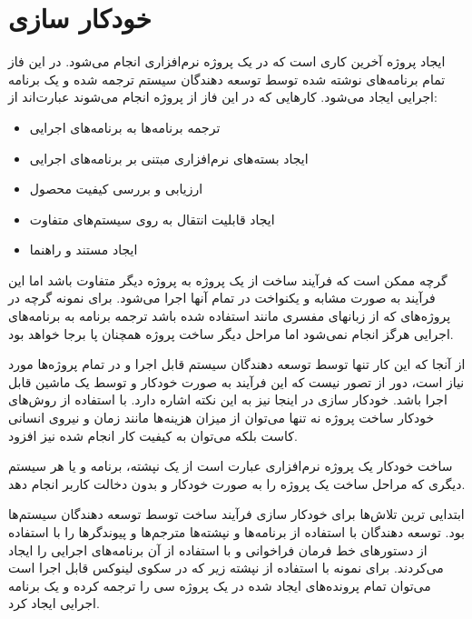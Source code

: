 

\chapter{خودکار سازی}

ایجاد پروژه آخرین کاری است که در یک پروژه نرم‌افزاری انجام می‌شود. در این  فاز
تمام برنامه‌های نوشته شده توسط توسعه دهندگان سیستم ترجمه شده و یک برنامه اجرایی
ایجاد می‌شود. کارهایی که در این فاز از پروژه انجام می‌شوند عبارت‌اند از:

\begin{itemize}
  \item ترجمه برنامه‌ها به برنامه‌های اجرایی
  \item ایجاد بسته‌های نرم‌افزاری مبتنی بر برنامه‌های اجرایی
  \item ارزیابی و بررسی کیفیت محصول
  \item ایجاد قابلیت انتقال به روی سیستم‌های متفاوت
  \item ایجاد مستند و راهنما
\end{itemize}

گرچه ممکن است که فرآیند ساخت از یک پروژه به پروژه دیگر متفاوت باشد اما این
فرآیند به صورت مشابه و یکنواخت در تمام آنها اجرا می‌شود. برای نمونه گرچه در
پروژه‌های که از زبانهای مفسری مانند  استفاده شده باشد ترجمه برنامه به
برنامه‌های اجرایی هرگز انجام نمی‌شود اما مراحل دیگر ساخت پروژه همچنان پا برجا
خواهد بود.

از آنجا که این کار تنها توسط توسعه دهندگان سیستم قابل اجرا و در تمام
پروژه‌ها مورد نیاز است، دور از تصور نیست که این فرآیند به صورت خودکار و توسط یک
ماشین قابل اجرا باشد. خودکار سازی در اینجا نیز به این نکته اشاره دارد. با
استفاده از روش‌های خودکار ساخت پروژه نه تنها می‌توان از میزان هزینه‌ها مانند
زمان و نیروی انسانی کاست بلکه می‌توان به کیفیت کار انجام شده نیز افزود.

ساخت خودکار یک پروژه نرم‌افزاری عبارت است از یک نپشته،
برنامه و یا هر سیستم دیگری که مراحل ساخت یک پروژه را به صورت خودکار و بدون دخالت
کاربر انجام دهد.
    

ابتدایی ترین تلاش‌ها برای خودکار سازی فرآیند ساخت توسط توسعه دهندگان سیستم‌ها
بود. توسعه دهندگان با استفاده از برنامه‌ها و نپشته‌ها مترجم‌ها و پیوندگرها را با
استفاده از دستورهای خط فرمان فراخوانی و با استفاده از آن برنامه‌های
اجرایی را ایجاد می‌کردند. برای نمونه با استفاده از نپشته زیر که در سکوی لینوکس
قابل اجرا است می‌توان تمام پرونده‌های ایجاد شده در یک پروژه سی را ترجمه کرده و
یک برنامه اجرایی ایجاد کرد.

